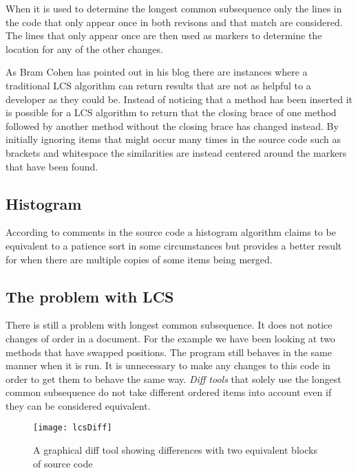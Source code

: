 When it is used to determine the longest common subsequence only the lines in the code that only appear once in both revisons and that match are considered. 
The lines that only appear once are then used as markers to determine the location for any of the other changes. 

As Bram Cohen has pointed out in his blog there are instances where a traditional LCS algorithm can return results that are not as helpful to a developer as they could be.  Instead of noticing that a method has been inserted it is possible for a LCS algorithm to return that the closing brace of one method followed by another method without the closing brace has changed instead. By initially ignoring items that might occur many times in the source code such as brackets and whitespace the similarities are instead centered around the markers that have been found. 

% 
% 

\subsection{Histogram}
According to comments in the source code a histogram algorithm claims to be equivalent to a patience sort in some circumstances but provides a better result for when there are multiple copies of some items being merged. 


\subsection{The problem with LCS}
There is still a problem with longest common subsequence. It does not notice changes of order in a document.  For the example we have been looking at two methods that have swapped positions.  The program still behaves in the same manner when it is run.  It is unnecessary to make any changes to this code in order to get them to behave the same way. \emph{Diff tools} that solely use the longest common subsequence do not take different ordered items into account even if they can be considered equivalent.

\begin{figure}[h]
\begin{center}
\texttt{[image: lcsDiff]}
\end{center}
 \caption{A graphical diff tool showing differences with two equivalent blocks of source code}
\end{figure}

